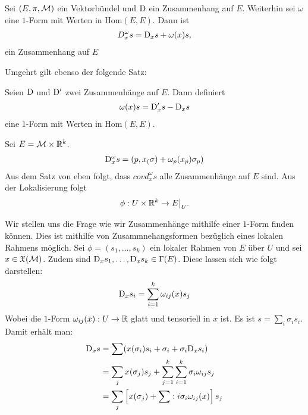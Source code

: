\begin{satz}
\label{satz:zusammenhangausform}
Sei $(E, \pi, \mathcal{M})$ ein Vektorbündel und $\mathrm{D}$ ein Zusammenhang auf $E$.
Weiterhin sei $\omega$ eine $1$-Form mit Werten in $\mathrm{Hom}(E, E)$.
Dann ist 
\begin{align}
D^\omega_x s = \mathrm{D}_x s + \omega(x) s,
\end{align}
ein Zusammenhang auf $E$
\end{satz}
Umgehrt gilt ebenso der folgende Satz:
\begin{satz}
Seien $\mathrm{D}$ und $\mathrm{D}'$ zwei Zusammenhänge auf $E$.
Dann definiert 
\begin{align}
\omega(x) s = \mathrm{D}'_x s - \mathrm{D}_x s
\end{align}
eine $1$-Form mit Werten in $\mathrm{Hom}(E, E)$.
\end{satz}
\begin{bsp}
Sei $E = \mathcal{M} \times \mathbb{R}^k$. 
\begin{align}
\mathrm{D}^\omega_x s = (p, x_(\sigma) + \omega_p (x_p)\sigma_p)
\end{align}
Aus dem Satz von eben folgt, dass $covd^\omega_x s$ alle Zusammenhänge auf $E$ sind.
Aus der Lokalisierung folgt
\begin{align}
\phi : U \times \mathbb{R}^k \to E\big\vert_U.
\end{align}
\end{bsp}
Wir stellen uns die Frage wie wir Zusammenhänge mithilfe einer $1$-Form finden können.
Dies ist mithilfe von Zusammnehangsformen bezüglich eines lokalen Rahmens möglich.
Sei $\phi = (s_1, \dots, s_k)$ ein lokaler Rahmen von $E$ über $U$ und sei $x \in \mathfrak{X}(\mathcal{M})$.
Zudem sind $\mathrm{D}_x s_1, \dots, \mathrm{D}_x s_k \in \Gamma(E)$.
Diese lassen sich wie folgt darstellen:
\begin{align}
\mathrm{D}_x s_i = \sum_{i=1}^k \omega_{ij}(x) s_j
\end{align}
Wobei die $1$-Form $\omega_{ij}(x): U \to \mathbb{R}$ glatt und tensoriell in $x$ ist.
Es ist $s = \sum_i \sigma_i s_i$. 
Damit erhält man:
\begin{align}
\mathrm{D}_x s &= \sum (x(\sigma_i)s_i + \sigma_i + \sigma_i \mathrm{D}_x s_i)\\
&= \sum_j x(\sigma_j)s_j + \sum_{j=1}^k \sum_{i=1}^k \sigma_i \omega_{ij} s_j\\
&= \sum_j \left[ x(\sigma_j) + \sum:i \sigma_i \omega_{ij}(x) \right] s_j
\end{align}


